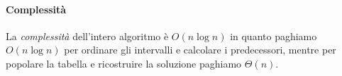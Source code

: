 \paragraph{Complessità}
La \emph{complessità} dell'intero algoritmo è $O(n\log n)$ in quanto paghiamo
$O(n\log n)$ per ordinare gli intervalli e calcolare i predecessori, mentre per
popolare la tabella e ricostruire la soluzione paghiamo $\Theta(n)$.